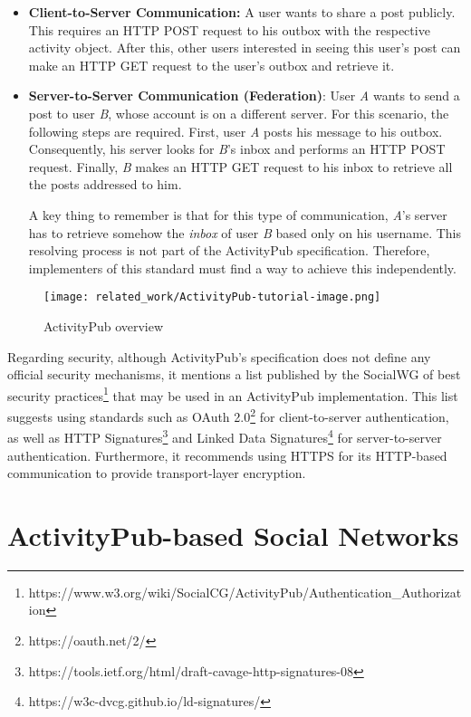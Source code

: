 \begin{itemize}
  \item \textbf{Client-to-Server Communication:} A user wants to share a post publicly. This requires an HTTP POST request to his outbox with the respective activity object. After this, other users interested in seeing this user's post can make an HTTP GET request to the user's outbox and retrieve it.
  \item \textbf{Server-to-Server Communication (Federation)}: User \emph{A} wants to send a post to user \emph{B}, whose account is on a different server. For this scenario, the following steps are required. First, user \emph{A} posts his message to his outbox. Consequently, his server looks for \emph{B}'s inbox and performs an HTTP POST request. Finally, \emph{B} makes an HTTP GET request to his inbox to retrieve all the posts addressed to him.
  
  A key thing to remember is that for this type of communication, \emph{A}'s server has to retrieve somehow the \emph{inbox} of user \emph{B} based only on his username. This resolving process is not part of the ActivityPub specification. Therefore, implementers of this standard must find a way to achieve this independently. 
\end{itemize}
 

\begin{figure}[H]
  \centering
  \texttt{[image: related\_work/ActivityPub-tutorial-image.png]}
  \caption{ActivityPub overview \cite{lemmer-webber_tallon_guy_prodromou_2018}}
  \label{fig:ap_flow}
\end{figure}


Regarding security, although ActivityPub's specification does not define any official security mechanisms, it mentions a list published by the SocialWG of best security practices\footnote{https://www.w3.org/wiki/SocialCG/ActivityPub/Authentication\_Authorization} that may be used in an ActivityPub implementation. This list suggests using standards such as OAuth 2.0\footnote{https://oauth.net/2/} for client-to-server authentication, as well as HTTP Signatures\footnote{https://tools.ietf.org/html/draft-cavage-http-signatures-08} and Linked Data Signatures\footnote{https://w3c-dvcg.github.io/ld-signatures/} for server-to-server authentication. Furthermore, it recommends using HTTPS for its HTTP-based communication to provide transport-layer encryption.


\section{ActivityPub-based Social Networks}

